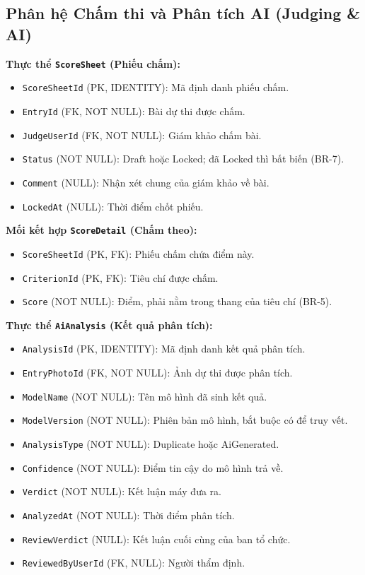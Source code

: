 \subsection{Phân hệ Chấm thi và Phân tích AI (Judging \& AI)}

\noindent\textbf{Thực thể \texttt{ScoreSheet} (Phiếu chấm):}

\begin{itemize}
    \item \texttt{ScoreSheetId} (PK, IDENTITY): Mã định danh phiếu chấm.
    \item \texttt{EntryId} (FK, NOT NULL): Bài dự thi được chấm.
    \item \texttt{JudgeUserId} (FK, NOT NULL): Giám khảo chấm bài.
    \item \texttt{Status} (NOT NULL): Draft hoặc Locked; đã Locked thì bất biến (BR-7).
    \item \texttt{Comment} (NULL): Nhận xét chung của giám khảo về bài.
    \item \texttt{LockedAt} (NULL): Thời điểm chốt phiếu.
\end{itemize}

\noindent\textbf{Mối kết hợp \texttt{ScoreDetail} (Chấm theo):}

\begin{itemize}
    \item \texttt{ScoreSheetId} (PK, FK): Phiếu chấm chứa điểm này.
    \item \texttt{CriterionId} (PK, FK): Tiêu chí được chấm.
    \item \texttt{Score} (NOT NULL): Điểm, phải nằm trong thang của tiêu chí (BR-5).
\end{itemize}

\noindent\textbf{Thực thể \texttt{AiAnalysis} (Kết quả phân tích):}

\begin{itemize}
    \item \texttt{AnalysisId} (PK, IDENTITY): Mã định danh kết quả phân tích.
    \item \texttt{EntryPhotoId} (FK, NOT NULL): Ảnh dự thi được phân tích.
    \item \texttt{ModelName} (NOT NULL): Tên mô hình đã sinh kết quả.
    \item \texttt{ModelVersion} (NOT NULL): Phiên bản mô hình, bắt buộc có để truy vết.
    \item \texttt{AnalysisType} (NOT NULL): Duplicate hoặc AiGenerated.
    \item \texttt{Confidence} (NOT NULL): Điểm tin cậy do mô hình trả về.
    \item \texttt{Verdict} (NOT NULL): Kết luận máy đưa ra.
    \item \texttt{AnalyzedAt} (NOT NULL): Thời điểm phân tích.
    \item \texttt{ReviewVerdict} (NULL): Kết luận cuối cùng của ban tổ chức.
    \item \texttt{ReviewedByUserId} (FK, NULL): Người thẩm định.
\end{itemize}

